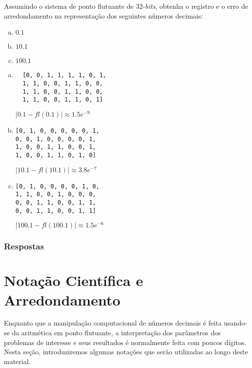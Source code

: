 \begin{exer}
  Assumindo o sistema de ponto flutuante de $32$-{\it bits}, obtenha o registro e o erro de arredondamento na representação dos seguintes números decimais:
  \begin{enumerate}[a)]
  \item $0.1$
  \item $10.1$
  \item $100.1$
  \end{enumerate}
\end{exer}
\begin{resp}
  \begin{enumerate}[a)]
  \item %
\begin{verbatim}
  [0, 0, 1, 1, 1, 1, 0, 1,
  1, 1, 0, 0, 1, 1, 0, 0,
  1, 1, 0, 0, 1, 1, 0, 0,
  1, 1, 0, 0, 1, 1, 0, 1]
\end{verbatim}

$|0.1 - fl(0.1)| \approx 1.5e^{-9}$

\item %
\begin{verbatim}
[0, 1, 0, 0, 0, 0, 0, 1,
0, 0, 1, 0, 0, 0, 0, 1,
1, 0, 0, 1, 1, 0, 0, 1,
1, 0, 0, 1, 1, 0, 1, 0]
\end{verbatim}
$|10.1 - fl(10.1)| \approx 3.8e^{-7}$

\item %
\begin{verbatim}
[0, 1, 0, 0, 0, 0, 1, 0,
1, 1, 0, 0, 1, 0, 0, 0,
0, 0, 1, 1, 0, 0, 1, 1,
0, 0, 1, 1, 0, 0, 1, 1]
\end{verbatim}
$|100.1 - fl(100.1)| \approx 1.5e^{-6}$
  \end{enumerate}
\end{resp}

\ifisbook
\subsubsection{Respostas}
\shipoutAnswer
\fi


\section{Notação Científica e Arredondamento}\label{cap_aritm_sec_notcient}

Enquanto que a manipulação computacional de números decimais é feita usando-se da aritmética em ponto flutuante, a interpretação dos parâmetros dos problemas de interesse e seus resultados é normalmente feita com poucos dígitos. Nesta seção, introduziremos algumas notações que serão utilizadas ao longo deste material.


